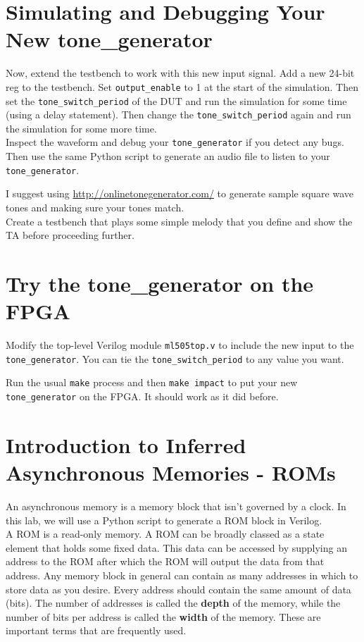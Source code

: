 \documentclass[11pt]{article}
\begin{document}
\section{Simulating and Debugging Your New tone\_generator}

Now, extend the testbench to work with this new input signal. Add a new 24-bit reg to the testbench. Set \verb|output_enable| to 1 at the start of the simulation. Then set the \verb|tone_switch_period| of the DUT and run the simulation for some time (using a delay statement). Then change the \verb|tone_switch_period| again and run the simulation for some more time.\\

Inspect the waveform and debug your \verb|tone_generator| if you detect any bugs. Then use the same Python script to generate an audio file to listen to your \verb|tone_generator|.

I suggest using \url{http://onlinetonegenerator.com/} to generate sample square wave tones and making sure your tones match.\\

Create a testbench that plays some simple melody that you define and show the TA before proceeding further.

\section{Try the tone\_generator on the FPGA}
Modify the top-level Verilog module \verb|ml505top.v| to include the new input to the \verb|tone_generator|. You can tie the \verb|tone_switch_period| to any value you want.

Run the usual \verb|make| process and then \verb|make impact| to put your new \verb|tone_generator| on the FPGA. It should work as it did before.

\section{Introduction to Inferred Asynchronous Memories - ROMs}
An asynchronous memory is a memory block that isn't governed by a clock. In this lab, we will use a Python script to generate a ROM block in Verilog.\\

A ROM is a read-only memory. A ROM can be broadly classed as a state element that holds some fixed data. This data can be accessed by supplying an address to the ROM after which the ROM will output the data from that address. Any memory block in general can contain as many addresses in which to store data as you desire. Every address should contain the same amount of data (bits). The number of addresses is called the \textbf{depth} of the memory, while the number of bits per address is called the \textbf{width} of the memory. These are important terms that are frequently used. \\
\end{document}
